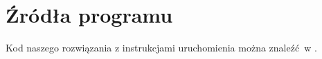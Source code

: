 \section{Źródła programu}
Kod naszego rozwiązania z instrukcjami uruchomienia można znaleźć w
\cite{github}.
